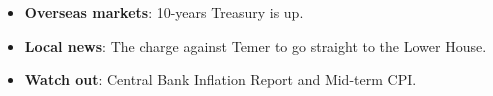 \begin{itemize}
\tightlist
\item
  \textbf{Overseas markets}: 10-years Treasury is up.
\item
  \textbf{Local news}: The charge against Temer to go straight to the
  Lower House.
\item
  \textbf{Watch out}: Central Bank Inflation Report and Mid-term CPI.
\end{itemize}
